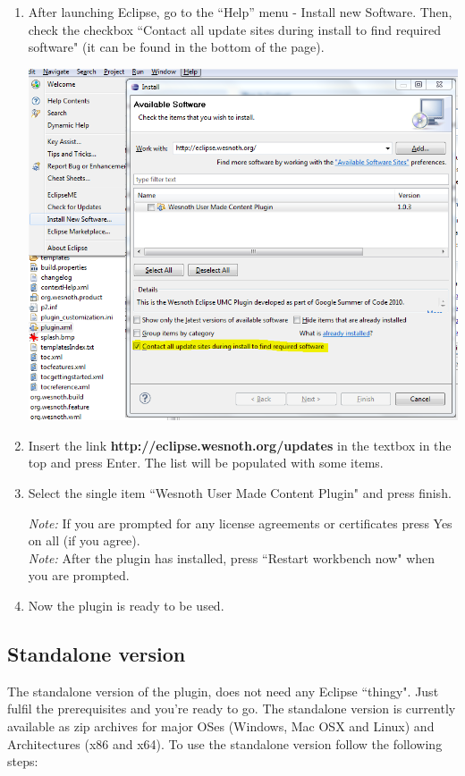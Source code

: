 \documentclass[10pt]{article}
\begin{document}
\begin{enumerate}
\item After launching Eclipse, go to the ``Help'' menu - Install new Software. Then, check the checkbox ``Contact all update sites during install to find required software" (it can be found in the bottom of the page).

\begin{center}
\includegraphics[scale=0.7]{install_new_software.png}
\end{center}

\item Insert the link \textbf{http://eclipse.wesnoth.org/updates} in the textbox in the top and press Enter. The list will be populated with some items.
\item Select the single item ``Wesnoth User Made Content Plugin" and press finish.

\textit{Note:} If you are prompted for any license agreements or certificates press Yes on all (if you agree).\\
\textit{Note:} After the plugin has installed, press ``Restart workbench now" when you are prompted.
\item Now the plugin is ready to be used.
\end{enumerate}

\subsection{Standalone version}
The standalone version of the plugin, does not need any Eclipse ``thingy". Just fulfil the prerequisites and you're ready to go. The standalone version is currently available as zip archives for major OSes (Windows, Mac OSX and Linux) and Architectures (x86 and x64). To use the standalone version follow the following steps:
\end{document}
